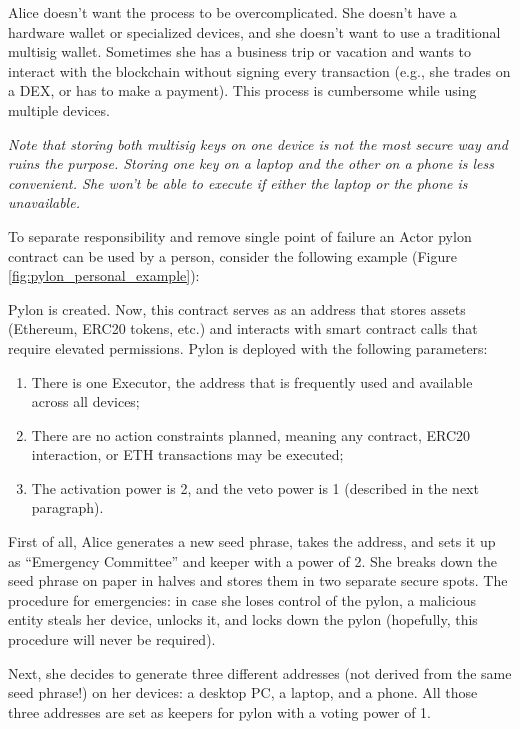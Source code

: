 \documentclass[12pt]{article}
\begin{document}
Alice doesn't want the process to be overcomplicated. She doesn't have a hardware wallet or specialized devices, and she doesn't want to use a traditional multisig wallet. Sometimes she has a business trip or vacation and wants to interact with the blockchain without signing every transaction (e.g., she trades on a DEX, or has to make a payment). This process is cumbersome while using multiple devices.

\smallskip
\emph{Note that storing both multisig keys on one device is not the most secure way and ruins the purpose. Storing one key on a laptop and the other on a phone is less convenient. She won’t be able to execute if either the laptop or the phone is unavailable.}

\medskip
To separate responsibility and remove single point of failure an Actor pylon contract can be used by a person, consider the following example (Figure \ref{fig:pylon_personal_example}):

Pylon is created. Now, this contract serves as an address that stores assets (Ethereum, ERC20 tokens, etc.) and interacts with smart contract calls that require elevated permissions. Pylon is deployed with the following parameters:
\begin{enumerate}
\item{There is one Executor, the address that is frequently used and available across all devices;}
\item{There are no action constraints planned, meaning any contract, ERC20 interaction, or ETH transactions may be executed;}
\item{The activation power is 2, and the veto power is 1 (described in the next paragraph).}
\end{enumerate}

First of all, Alice generates a new seed phrase, takes the address, and sets it up as ``Emergency Committee'' and keeper with a power of 2. She breaks down the seed phrase on paper in halves and stores them in two separate secure spots. The procedure for emergencies: in case she loses control of the pylon, a malicious entity steals her device, unlocks it, and locks down the pylon (hopefully, this procedure will never be required).

Next, she decides to generate three different addresses (not derived from the same seed phrase!) on her devices: a desktop PC, a laptop, and a phone. All those three addresses are set as keepers for pylon with a voting power of 1.
\end{document}
